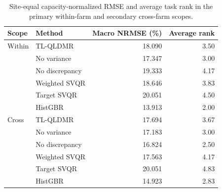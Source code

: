\begin{table}[pos=t]
\centering
\color{blue}
\caption{Site-equal capacity-normalized RMSE and average task rank in the primary within-farm and secondary cross-farm scopes.}
\label{tab:selection-v2-scope}
\small
\setlength{\tabcolsep}{4pt}
\begin{tabular}{llrr}
\toprule
Scope & Method & Macro NRMSE (\%) & Average rank \\
\midrule
Within & TL-QLDMR & 18.090 & 3.50 \\
 & No variance & 17.347 & 3.00 \\
 & No discrepancy & 19.333 & 4.17 \\
 & Weighted SVQR & 18.646 & 3.83 \\
 & Target SVQR & 20.051 & 4.50 \\
 & HistGBR & 13.913 & 2.00 \\
\midrule
Cross & TL-QLDMR & 17.694 & 3.67 \\
 & No variance & 17.183 & 3.00 \\
 & No discrepancy & 16.824 & 2.50 \\
 & Weighted SVQR & 17.563 & 4.17 \\
 & Target SVQR & 20.051 & 4.83 \\
 & HistGBR & 14.923 & 2.83 \\
\bottomrule
\end{tabular}
\end{table}
